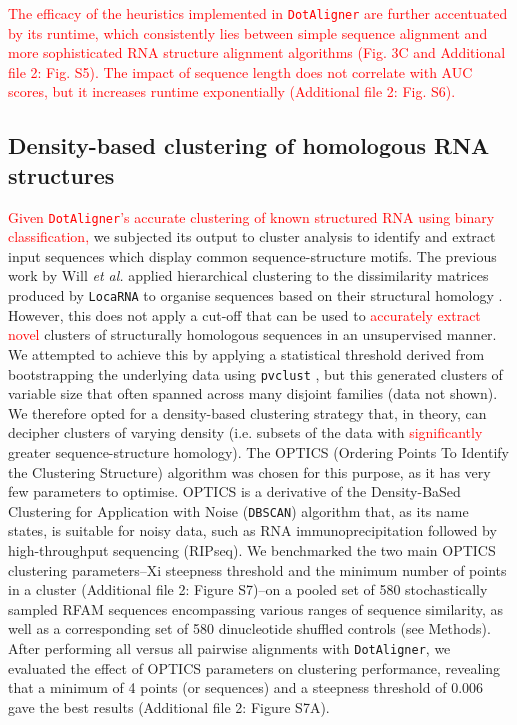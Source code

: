 \documentclass{bmcart}
\newcommand\dotaligner{\texttt{DotAligner}}
\newcommand\locarna{\texttt{LocaRNA}}
\begin{document}
\textcolor{red} {The efficacy of the heuristics implemented in \dotaligner{} are further accentuated by its runtime, which consistently lies between simple sequence alignment and more sophisticated 
RNA structure alignment algorithms (Fig. 3C and Additional file 2: Fig. S5). The impact of sequence length
does not correlate with AUC scores, but it increases runtime exponentially (Additional file 2: Fig. S6). 
}

\subsection*{Density-based clustering of homologous RNA structures}

\textcolor{red}{Given \dotaligner{}'s accurate clustering of known structured RNA using
binary classification,} we subjected its
output to cluster analysis to identify and extract input sequences which display common
sequence-structure motifs. The previous work by Will \textit{et al.} applied hierarchical clustering 
to the dissimilarity matrices produced by \locarna{} to organise sequences based on their
structural homology \cite{Will17432929}. However, this does not apply a cut-off that can be used 
to \textcolor{red}{accurately extract novel} clusters of structurally homologous sequences in an unsupervised 
manner. We attempted to achieve this by applying a statistical threshold derived from 
bootstrapping the underlying data using \texttt{pvclust} \cite{suzuki2006pvclust}, but this
generated clusters of variable size that often spanned across many disjoint families 
(data not shown).\\

We therefore opted for a density-based clustering strategy that, in theory, can decipher 
clusters of varying density (i.e. subsets of the data with \textcolor{red}{significantly} greater sequence-structure homology). The OPTICS (Ordering Points To Identify the Clustering Structure) algorithm \cite{ankerst99ordering} was chosen for this purpose, as it has very few parameters to optimise. 
OPTICS is a derivative of the Density-BaSed Clustering for Application with Noise
 (\texttt{DBSCAN}) \cite{ester1996density} algorithm that, as its name states, is suitable 
 for noisy data, such as RNA immunoprecipitation followed by high-throughput sequencing 
 (RIPseq). We  benchmarked the two main OPTICS clustering parameters--Xi steepness threshold 
and the minimum number of points in a cluster (Additional file 2: Figure S7)--on 
a pooled set of 580 stochastically sampled RFAM sequences encompassing various ranges of sequence similarity, as well as a corresponding set of 580 dinucleotide shuffled controls (see Methods). 
After performing all versus all pairwise alignments with \dotaligner{}, 
we evaluated the effect of OPTICS parameters on clustering performance, 
revealing that a minimum of 4 points (or sequences) and a steepness threshold of 0.006 
gave the best results (Additional file 2: Figure S7A). \\
\end{document}
